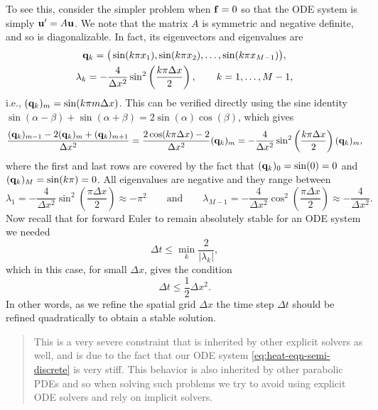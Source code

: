 To see this, consider the simpler problem when $\mathbf{f} = 0$ so that 
the ODE system is simply $\mathbf{u}' = A \mathbf{u}$.  
We note that the matrix $A$ is symmetric and negative definite, and so 
is diagonalizable. In fact, its eigenvectors and eigenvalues are
\begin{equation*}
    \begin{gathered}
    \mathbf{q}_k = \big( \sin(k \pi x_1), \sin(k \pi x_2), \dots, \sin(k \pi x_{M-1}) \big), \\
    \lambda_k = -\frac{4}{\Delta x^2} \sin^2\left( \frac{k \pi \Delta x}{2} \right),
    \qquad k = 1, \dots, M-1,
    \end{gathered}
\end{equation*}
i.e., $(\mathbf{q}_k)_m = \sin(k \pi m \Delta x)$. This can be verified directly using the 
sine identity
$\sin(\alpha - \beta) + \sin(\alpha + \beta) = 2 \sin(\alpha) \cos(\beta)$, which gives
\begin{equation*}
    \frac{(\mathbf{q}_k)_{m-1} - 2 (\mathbf{q}_k)_m + (\mathbf{q}_k)_{m+1}}{\Delta x^2}
    = \frac{2 \cos(k \pi \Delta x) - 2}{\Delta x^2} (\mathbf{q}_k)_m
    = -\frac{4}{\Delta x^2} \sin^2\left( \frac{k \pi \Delta x}{2} \right) (\mathbf{q}_k)_m,
\end{equation*}
where the first and last rows are covered by the fact that
$(\mathbf{q}_k)_0 = \sin(0) = 0$ and $(\mathbf{q}_k)_M = \sin(k \pi) = 0$.
All eigenvalues are negative and they range between
\begin{equation*}
    \lambda_1 = -\frac{4}{\Delta x^2} \sin^2\left( \frac{\pi \Delta x}{2} \right) \approx - \pi^2
    \qquad \text{and} \qquad
    \lambda_{M-1} = -\frac{4}{\Delta x^2} \cos^2\left( \frac{\pi \Delta x}{2} \right) \approx - \frac{4}{\Delta x^2}.
\end{equation*}
Now recall that for forward Euler to remain absolutely stable for an ODE system we needed 
\begin{equation*}
    \Delta t \le \min_k \frac{2}{| \lambda_k | },
\end{equation*}
which in this case, for small $\Delta x$, gives the condition 
\begin{equation*}
    \Delta t \le \frac{1}{2} \Delta x^2.
\end{equation*}
In other words, as we refine the spatial grid $\Delta x$ the time step $\Delta t$ 
should be refined quadratically to obtain a stable solution.

\begin{quote}
    This is a very severe constraint that is inherited by other explicit solvers as well, 
    and is due to the fact that our ODE system \eqref{eq:heat-eqn-semi-discrete} is 
    very stiff. This behavior is also inherited by other parabolic PDEs and so 
    when solving such problems we try to avoid using explicit ODE solvers and rely on 
    implicit solvers.
\end{quote}


